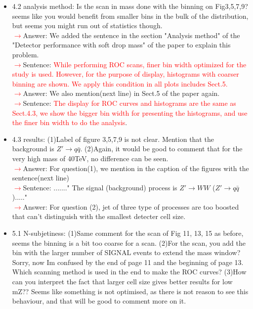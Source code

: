 \documentclass[final,1p,11pt]{elsarticle}
\begin{document}
\begin{itemize}
\item 4.2 analysis method: Is the scan in mass done with the binning on Fig3,5,7,9? seems like you would benefit from smaller bins in the bulk of the distribution, but seems you might run out of statistics though.\\
 \textcolor{red}{$\rightarrow$}Answer: We added the sentence in the section "Analysis method" of the "Detector performance with soft drop mass" of the paper to explain this problem.\\
 \textcolor{red}{$\rightarrow$}Sentence: \textcolor{red}{While performing ROC scans, finer bin width optimized for the study is used. However, for the purpose of display, histograms with coarser binning are shown. We apply this condition in all plots includes Sect.5.}\\
 \textcolor{red}{$\rightarrow$}Answer: We also mention(next line) in Sect.5 of the paper again.\\
 \textcolor{red}{$\rightarrow$}Sentence: \textcolor{red}{The display for ROC curves and histograms are the same as Sect.4.3, we show the bigger bin width for presenting the histograms, and use the finer bin width to do the analysis}.
\item 4.3 results: (1)Label of figure 3,5,7,9 is not clear. Mention that the background is $Z'\rightarrow q\bar{q}$. (2)Again, it would be good to comment that for the very high mass of 40TeV, no difference can be seen.\\
 \textcolor{red}{$\rightarrow$}Answer:  For question(1), we mention in the caption of the figures with the sentence(next line)\\
 \textcolor{red}{$\rightarrow$}Sentence:  ......." The signal (background) process is $Z' \rightarrow WW$ ($Z'\rightarrow q\bar{q}$)....."\\
 \textcolor{red}{$\rightarrow$}Answer:  For question (2), jet of three type of processes are too boosted that can't distinguish with the smallest detecter cell size.\\
\item 5.1 N-subjetiness: (1)Same comment for the scan of Fig 11, 13, 15 as before, seems the binning is a bit too coarse for a scan. (2)For the scan, you add the bin with the larger number of SIGNAL events to extend the mass window? Sorry, now Im confused by the end of page 11 and the beginning of page 13. Which scanning method is used in the end to make the ROC curves? (3)How can you interpret the fact that larger cell size gives better results for low mZ?? Seems like something is not optimised, as there is not reason to see this behaviour, and that will be good to comment more on it.\\

\end{itemize}
\end{document}
